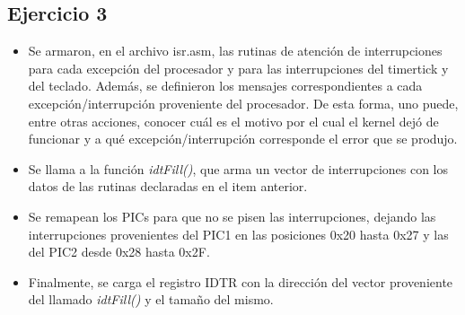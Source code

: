 \subsection{Ejercicio 3}
\begin{itemize}
 \item Se armaron, en el archivo isr.asm, las rutinas de atenci\'on de interrupciones para cada excepci\'on del procesador y para las interrupciones del timertick y del teclado. Adem\'as, se definieron los mensajes correspondientes a cada excepci\'on/interrupci\'on proveniente del procesador. De esta forma, uno puede, entre otras acciones, conocer cu\'al es el motivo por el cual el kernel dej\'o de funcionar y a qu\'e excepci\'on/interrupci\'on corresponde el error que se produjo.
 \item Se llama a la funci\'on \textit{idtFill()}, que arma un vector de interrupciones con los datos de las rutinas declaradas en el item anterior.
 \item Se remapean los PICs para que no se pisen las interrupciones, dejando las interrupciones provenientes del PIC1 en las posiciones 0x20 hasta 0x27 y las del PIC2 desde 0x28 hasta 0x2F.
 \item Finalmente, se carga el registro IDTR con la direcci\'on del vector proveniente del llamado \textit{idtFill()} y el tama\~no del mismo.
\end{itemize}


